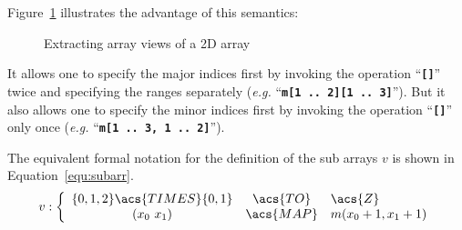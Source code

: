 \documentclass[12pt,a4paper,oneside,openright]{book}
\newcommand{\eg}{\emph{e.g.} }
\newcommand{\equ}[1]{Equation~\ref{equ:#1}}
\newcommand{\fig}[1]{Figure~\ref{fig:#1}}
\newcommand{\code}[1]{``\texttt{\textbf{\textcolor{codegray}{\small{#1}}}}''}
\begin{document}
\begin{CJK}{UTF8}{}
\fig{select} illustrates the advantage of this semantics:
\begin{figure}[htbp]
  \begin{center}
    \caption{Extracting array views of a \acs{2D} array\label{fig:select}}
  \end{center}
\end{figure}
It allows one to specify the major indices first by invoking the operation \code{[]} twice and specifying the ranges separately (\eg \code{m[1 .. 2][1 .. 3]}). But it also allows one to specify the minor indices first by invoking the operation \code{[]} only once (\eg \code{m[1 .. 3, 1 .. 2]}).

The equivalent formal notation for the definition of the sub arrays $v$ is shown in \equ{subarr}.
\begin{equation}\label{equ:subarr}
  v:\left\{\begin{array}{ccl}\{0,1,2\}\acs{TIMES}\{0,1\}&\acs{TO}&\acs{Z}\\(x_0\ x_1)&\acs{MAP}&m(x_0+1,x_1+1)\end{array}\right.
\end{equation}


\end{CJK}
\end{document}
